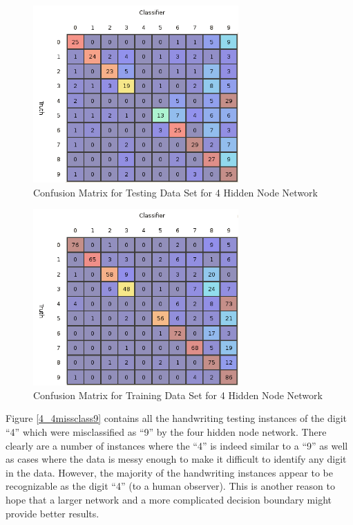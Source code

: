\documentclass{article}
\begin{document}
\begin{figure}
\centering
\includegraphics[width=0.7\textwidth]{data/final/4_test_confusion.png}
\caption{Confusion Matrix for Testing Data Set for 4 Hidden Node Network}
\label{testconfusion4}
\end{figure}

\begin{figure}
\centering
\includegraphics[width=0.7\textwidth]{data/final/4_train_confusion.png}
\caption{Confusion Matrix for Training Data Set for 4 Hidden Node Network}
\label{trainconfusion4}
\end{figure}

Figure \ref{4_4missclass9} contains all the handwriting testing instances of the digit ``4'' which were misclassified as ``9'' by the four hidden node network. There clearly are a number of instances where the ``4'' is indeed similar to a ``9'' as well as cases where the data is messy enough to make it difficult to identify any digit in the data. However, the majority of the handwriting instances appear to be recognizable as the digit ``4'' (to a human observer). This is another reason to hope that a larger network and a more complicated decision boundary might provide better results.
\end{document}
